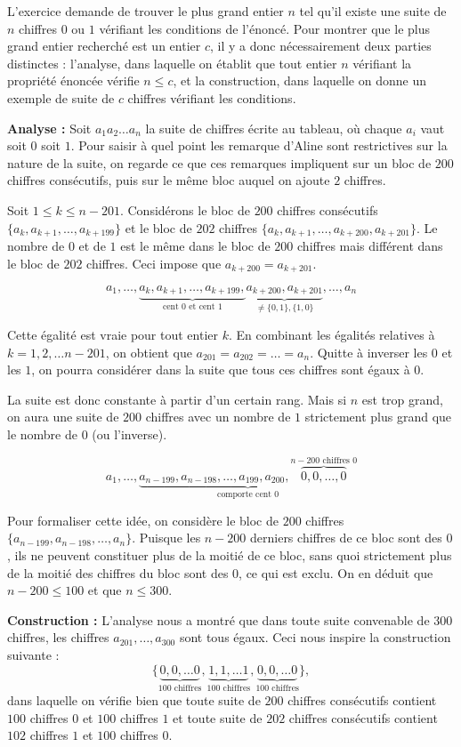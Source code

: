 L'exercice demande de trouver le plus grand entier $n$ tel qu'il existe une suite de $n$ chiffres $0$ ou $1$ vérifiant les conditions de l'énoncé. Pour montrer que le plus grand entier recherché est un entier $c$, il y a donc nécessairement deux parties distinctes : l'analyse, dans laquelle on établit que tout entier $n$ vérifiant la propriété énoncée vérifie $n\le c$, et la construction, dans laquelle on donne un exemple de suite de $c$ chiffres vérifiant les conditions.

\medskip

\textbf{Analyse :} Soit $a_1a_2\ldots a_n$ la suite de chiffres écrite au tableau, où chaque $a_i$ vaut soit $0$ soit $1$. Pour saisir à quel point les remarque d'Aline sont restrictives sur la nature de la suite, on regarde ce que ces remarques impliquent sur un bloc de $200$ chiffres consécutifs, puis sur le même bloc auquel on ajoute $2$ chiffres.

Soit $1\le k\le n-201$. Considérons le bloc de $200$ chiffres consécutifs $\{a_k,a_{k+1},\ldots, a_{k+199}\}$ et le bloc de $202$ chiffres $\{a_k,a_{k+1},\ldots ,a_{k+200},a_{k+201}\}$. Le nombre de $0$ et de $1$ est le même dans le bloc de $200$ chiffres mais différent dans le bloc de $202$ chiffres. Ceci impose que $a_{k+200}=a_{k +201}$.

$$a_1, \ldots ,\underbrace{a_k, a_{k+1}, \ldots , a_{k+199},}_{\text{cent $0$ et cent $1$}} \underbrace{a_{k+200}, a_{k+201}}_{\neq \{0,1\},\{1,0\}}, \ldots , a_n$$

Cette égalité est vraie pour tout entier $k$. En combinant les égalités relatives à $k=1, 2, \ldots n-201$, on obtient que $a_{201}=a_{202}= \ldots = a_n$. Quitte à inverser les $0$ et les $1$, on pourra considérer dans la suite que tous ces chiffres sont égaux à $0$.

La suite est donc constante à partir d'un certain rang. Mais si $n$ est trop grand, on aura une suite de $200$ chiffres avec un nombre de $1$ strictement plus grand que le nombre de $0$ (ou l'inverse).

$$a_1, \ldots , \underbrace{a_{n-199}, a_{n-198}, \ldots , a_{199}, a_{200}, \overbrace{0, 0,\ldots ,0}^{\text{$n-200$ chiffres $0$}}}_{\text{comporte cent $0$} }$$

Pour formaliser cette idée, on considère le bloc de $200$ chiffres $\{a_{n-199}, a_{n-198} , \ldots , a_n\}$. Puisque les $n-200$ derniers chiffres de ce bloc sont des $0$, ils ne peuvent constituer plus de la moitié de ce bloc, sans quoi strictement plus de la moitié des chiffres du bloc sont des $0$, ce qui est exclu. On en déduit que $n-200 \le 100$ et que $n\le 300$.

\medskip

\textbf{Construction :} L'analyse nous a montré que dans toute suite convenable de $300$ chiffres, les chiffres $a_{201}, \ldots , a_{300}$ sont tous égaux. Ceci nous inspire la construction suivante :
$$ \{\underbrace{0,0, \ldots 0}_{100 \text{ chiffres}} ,\underbrace{1,1, \ldots 1}_{100 \text{ chiffres}}, \underbrace{0,0,\ldots 0}_{100 \text{ chiffres}} \},$$
dans laquelle on vérifie bien que toute suite de $200$ chiffres consécutifs contient $100$ chiffres $0$ et $100$ chiffres $1$ et toute suite de $202$ chiffres consécutifs contient $102$ chiffres $1$ et $100$ chiffres $0$.